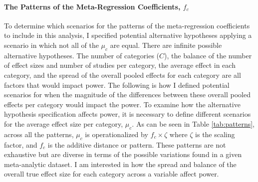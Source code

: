 \paragraph{The Patterns of the Meta-Regression Coefficients, $f_c$} \label{sec: patterns}

To determine which scenarios for the patterns of the meta-regression coefficients to include in this analysis, I specified potential alternative hypotheses applying a scenario in which not all of the $\mu_c$ are equal. There are infinite possible alternative hypotheses. The number of categories ($C$), the balance of the number of effect sizes and number of studies per category, the average effect in each category, and the spread of the overall pooled effects for each category are all factors that would impact power. The following is how I defined potential scenarios for when the magnitude of the differences between these overall pooled effects per category would impact the power.  
To examine how the alternative hypothesis specification affects power, it is necessary to define different scenarios for the average effect size per category, $\mu_c$. 
As can be seen in Table \ref{tab:patterns}, across all the patterns, $\mu_c$ is operationalized by $f_c \times \zeta$ where $\zeta$ is the scaling factor, and $f_c$ is the additive distance or pattern. These patterns are not exhaustive but are diverse in terms of the possible variations found in a given meta-analytic dataset. I am interested in how the spread and balance of the overall true effect size for each category across a variable affect power. 


